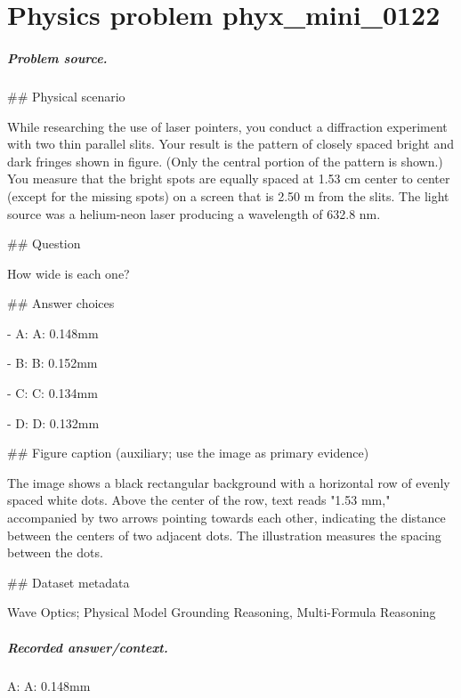 
\chapter{Physics problem phyx\_mini\_0122}
\label{ch:PhyXMiniProblems_problem_phyx_mini_0122}

\paragraph{Problem source.}
\#\# Physical scenario

While researching the use of laser pointers, you conduct a diffraction experiment with two thin parallel slits. Your result is the pattern of closely spaced bright and dark fringes shown in figure. (Only the central portion of the pattern is shown.) You measure that the bright spots are equally spaced at 1.53 cm center to center (except for the missing spots) on a screen that is 2.50 m from the slits. The light source was a helium-neon laser producing a wavelength of 632.8 nm.

\#\# Question

How wide is each one?

\#\# Answer choices

- A: A: 0.148mm

- B: B: 0.152mm

- C: C: 0.134mm

- D: D: 0.132mm

\#\# Figure caption (auxiliary; use the image as primary evidence)

The image shows a black rectangular background with a horizontal row of evenly spaced white dots. Above the center of the row, text reads "1.53 mm," accompanied by two arrows pointing towards each other, indicating the distance between the centers of two adjacent dots. The illustration measures the spacing between the dots.

\#\# Dataset metadata

Wave Optics; Physical Model Grounding Reasoning, Multi-Formula Reasoning

\paragraph{Recorded answer/context.}
A: A: 0.148mm

